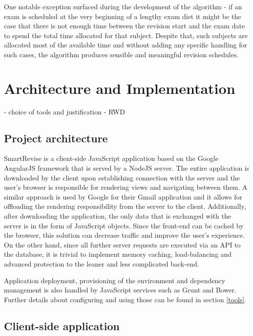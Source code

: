 \documentclass[bsc,frontabs,twoside,singlespacing,parskip]{infthesis}     %
\begin{document}
		One notable exception surfaced during the development of the algorithm - if an exam is scheduled at the very beginning of a lengthy exam diet it might be the case that there is not enough time between the revision start and the exam date to spend the total time allocated for that subject. Despite that, such subjects are allocated most of the available time and without adding any specific handling for such cases, the algorithm produces sensible and meaningful revision schedules.




\chapter{Architecture and Implementation}

	- choice of tools and justification
	- RWD

	\section{Project architecture}

		SmartRevise is a client-side JavaScript application based on the Google AngularJS framework that is served by a NodeJS server. The entire application is downloaded by the client upon establishing connection with the server and the user's browser is responsible for rendering views and navigating between them. A similar approach is used by Google for their Gmail application and it allows for offloading the rendering responsibility from the server to the client. Additionally, after downloading the application, the only data that is exchanged with the server is in the form of JavaScript objects. Since the front-end can be cached by the browser, this solution can decrease traffic and improve the user's experience. On the other hand, since all further server requests are executed via an API to the database, it is trivial to implement memory caching, load-balancing and advanced protection to the leaner and less complicated back-end.

		Application deployment, provisioning of the environment and dependency management is also handled by JavaScript services such as Grunt and Bower. Further details about configuring and using those can be found in section \ref{tools}.

	\section{Client-side application}
\end{document}
